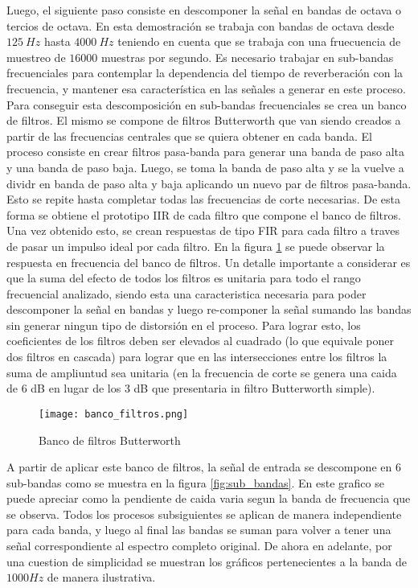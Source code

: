 Luego, el siguiente paso consiste en descomponer la señal en bandas de octava o tercios de octava. En esta demostración se trabaja con bandas de octava desde $125 \ Hz$ hasta $4000 \ Hz$ teniendo en cuenta que se trabaja con una fruecuencia de muestreo de $16000$ muestras por segundo. Es necesario trabajar en sub-bandas frecuenciales para contemplar la dependencia del tiempo de reverberación con la frecuencia, y mantener esa característica en las señales a generar en este proceso. Para conseguir esta descomposición en sub-bandas frecuenciales se crea un banco de filtros. El mismo se compone de filtros Butterworth que van siendo creados a partir de las frecuencias centrales que se quiera obtener en cada banda. El proceso consiste en crear filtros pasa-banda para generar una banda de paso alta y una banda de paso baja. Luego, se toma la banda de paso alta y se la vuelve a dividr en banda de paso alta y baja aplicando un nuevo par de filtros pasa-banda. Esto se repite hasta completar todas las frecuencias de corte necesarias. De esta forma se obtiene el prototipo IIR de cada filtro que compone el banco de filtros. Una vez obtenido esto, se crean respuestas de tipo FIR para cada filtro a traves de pasar un impulso ideal por cada filtro. En la figura \ref{fig:banco_filtros} se puede observar la respuesta en frecuencia del banco de filtros. Un detalle importante a considerar es que la suma del efecto de todos los filtros es unitaria para todo el rango frecuencial analizado, siendo esta una caracteristica necesaria para poder descomponer la señal en bandas y luego re-componer la señal sumando las bandas sin generar ningun tipo de distorsión en el proceso. Para lograr esto, los coeficientes de los filtros deben ser elevados al cuadrado (lo que equivale poner dos filtros en cascada) para lograr que en las intersecciones entre los filtros la suma de ampliuntud sea unitaria (en la frecuencia de corte se genera una caida de 6 dB en lugar de los 3 dB que presentaria in filtro Butterworth simple). 

\begin{figure}[H]
	\centering{}
	\texttt{[image: banco\_filtros.png]}
	\caption{Banco de filtros Butterworth}
	\label{fig:banco_filtros}
\end{figure}

A partir de aplicar este banco de filtros, la señal de entrada se descompone en 6 sub-bandas como se muestra en la figura \ref{fig:sub_bandas}. En este grafico se puede apreciar como la pendiente de caida varia segun la banda de frecuencia que se observa. Todos los procesos subsiguientes se aplican de manera independiente para cada banda, y luego al final las bandas se suman para volver a tener una señal correspondiente al espectro completo original. De ahora en adelante, por una cuestion de simplicidad se muestran los gráficos pertenecientes a la banda de $1000 Hz$ de manera ilustrativa.

